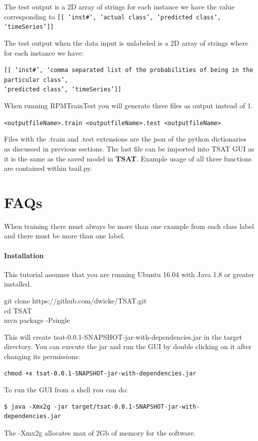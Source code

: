 \documentclass[letterpaper, 12pt]{article}
\newenvironment{allintypewriter}{\ttfamily}{\par}
\def\bsq#1{%
	\lq{#1}\rq}
\newcommand\TSAT{\textbf{TSAT}}
\begin{document}
The test output is a 2D array of strings for each instance we have the value corresponding to 
\texttt{[[\bsq{inst\#}, \bsq{actual class}, \bsq{predicted class}, \bsq{timeSeries}]]}

The test output when the data input is unlabeled is a 2D array of strings where for each instance we have:

\texttt{[[\bsq{inst\#}, \bsq{comma separated list of the probabilities of being in the particular class},\\\bsq{predicted class}, \bsq{timeSeries}]]}

When running RPMTrainTest you will generate three files as output instead of 1.

\texttt{<outputfileName>.train
<outputfileName>.test
<outputfileName>}

Files with the .train and .test extensions are the json of the python dictionaries as discussed in previous sections.  The last file can be imported into TSAT GUI as it is the same as the saved model in {\TSAT}. Example usage of all three functions are contained within tsail.py.

\section{FAQs}

When training there must always be more than one example from each class label and there must be more than one label.

\paragraph{Installation}

This tutorial assumes that you are running Ubuntu 16.04 with Java 1.8 or greater installed.

\begin{allintypewriter}
	\noindent git clone https://github.com/dwicke/TSAT.git\\
	cd TSAT\\
	mvn package -Psingle\\
\end{allintypewriter}
This will create tsat-0.0.1-SNAPSHOT-jar-with-dependencies.jar in the target directory.  You can execute the jar and run the GUI by double clicking on it after changing its permissions:
\begin{verbatim}
chmod +x tsat-0.0.1-SNAPSHOT-jar-with-dependencies.jar
\end{verbatim}  


To run the GUI from a shell you can do:
\begin{verbatim}
$ java -Xmx2g -jar target/tsat-0.0.1-SNAPSHOT-jar-with-dependencies.jar 
\end{verbatim}

The -Xmx2g allocates max of 2Gb of memory for the software.





\end{document}
